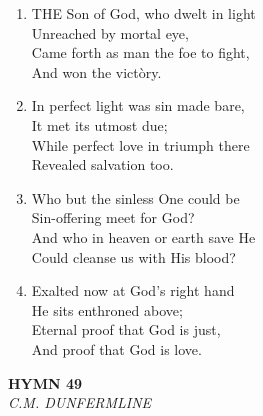 \begin{enumerate}
    \item THE Son of God, who dwelt in light \\
        Unreached by mortal eye, \\
        Came forth as man the foe to fight, \\
        And won the vict\`ory.

    \item In perfect light was sin made bare, \\
        It met its utmost due; \\
        While perfect love in triumph there \\
        Revealed salvation too.

    \item Who but the sinless One could be \\
        Sin-offering meet for God? \\
        And who in heaven or earth save He \\
        Could cleanse us with His blood?

    \item Exalted now at God's right hand \\
        He sits enthroned above; \\
        Eternal proof that God is just, \\
        And proof that God is love.

\end{enumerate}

\newpage
\begin{center}
    {\Large \textbf{HYMN 49}}
    \\
    \textit{C.M. DUNFERMLINE}
\end{center}
\vspace{1em}

